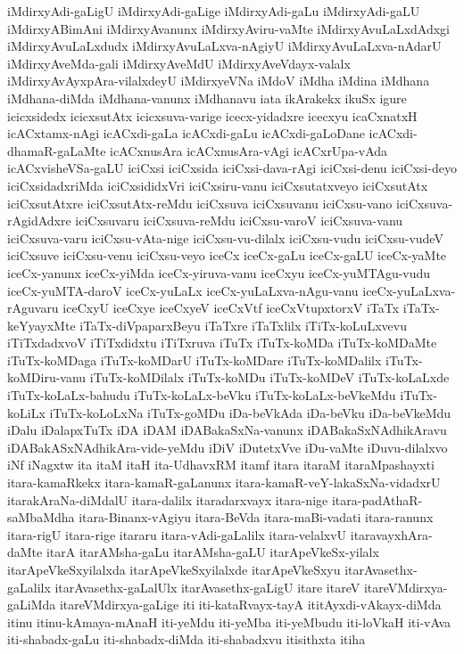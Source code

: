 {iMdirxyAdi-gaLigU
iMdirxyAdi-gaLige
iMdirxyAdi-gaLu
iMdirxyAdi-gaLU
iMdirxyABimAni
iMdirxyAvanunx
iMdirxyAviru-vaMte
iMdirxyAvuLaLxdAdxgi
iMdirxyAvuLaLxdudx
iMdirxyAvuLaLxva-nAgiyU
iMdirxyAvuLaLxva-nAdarU
iMdirxyAveMda-gali
iMdirxyAveMdU
iMdirxyAveVdayx-valalx
iMdirxyAvAyxpAra-vilalxdeyU
iMdirxyeVNa
iMdoV
iMdha
iMdina
iMdhana
iMdhana-diMda
iMdhana-vanunx
iMdhanavu
iata
ikArakekx
ikuSx
igure
icicxsidedx
icicxsutAtx
icicxsuva-varige
icecx-yidadxre
icecxyu
icaCxnatxH
icACxtamx-nAgi
icACxdi-gaLa
icACxdi-gaLu
icACxdi-gaLoDane
icACxdi-dhamaR-gaLaMte
icACxnusAra
icACxnusAra-vAgi
icACxrUpa-vAda
icACxvisheVSa-gaLU
iciCxsi
iciCxsida
iciCxsi-dava-rAgi
iciCxsi-denu
iciCxsi-deyo
iciCxsidadxriMda
iciCxsididxVri
iciCxsiru-vanu
iciCxsutatxveyo
iciCxsutAtx
iciCxsutAtxre
iciCxsutAtx-reMdu
iciCxsuva
iciCxsuvanu
iciCxsu-vano
iciCxsuva-rAgidAdxre
iciCxsuvaru
iciCxsuva-reMdu
iciCxsu-varoV
iciCxsuva-vanu
iciCxsuva-varu
iciCxsu-vAta-nige
iciCxsu-vu-dilalx
iciCxsu-vudu
iciCxsu-vudeV
iciCxsuve
iciCxsu-venu
iciCxsu-veyo
iceCx
iceCx-gaLu
iceCx-gaLU
iceCx-yaMte
iceCx-yanunx
iceCx-yiMda
iceCx-yiruva-vanu
iceCxyu
iceCx-yuMTAgu-vudu
iceCx-yuMTA-daroV
iceCx-yuLaLx
iceCx-yuLaLxva-nAgu-vanu
iceCx-yuLaLxva-rAguvaru
iceCxyU
iceCxye
iceCxyeV
iceCxVtf
iceCxVtupxtorxV
iTaTx
iTaTx-keYyayxMte
iTaTx-diVpaparxBeyu
iTaTxre
iTaTxlilx
iTiTx-koLuLxvevu
iTiTxdadxvoV
iTiTxdidxtu
iTiTxruva
iTuTx
iTuTx-koMDa
iTuTx-koMDaMte
iTuTx-koMDaga
iTuTx-koMDarU
iTuTx-koMDare
iTuTx-koMDalilx
iTuTx-koMDiru-vanu
iTuTx-koMDilalx
iTuTx-koMDu
iTuTx-koMDeV
iTuTx-koLaLxde
iTuTx-koLaLx-bahudu
iTuTx-koLaLx-beVku
iTuTx-koLaLx-beVkeMdu
iTuTx-koLiLx
iTuTx-koLoLxNa
iTuTx-goMDu
iDa-beVkAda
iDa-beVku
iDa-beVkeMdu
iDalu
iDalapxTuTx
iDA
iDAM
iDABakaSxNa-vanunx
iDABakaSxNAdhikAravu
iDABakASxNAdhikAra-vide-yeMdu
iDiV
iDutetxVve
iDu-vaMte
iDuvu-dilalxvo
iNf
iNagxtw
ita
itaM
itaH
ita-UdhavxRM
itamf
itara
itaraM
itaraMpashayxti
itara-kamaRkekx
itara-kamaR-gaLanunx
itara-kamaR-veY-lakaSxNa-vidadxrU
itarakAraNa-diMdalU
itara-dalilx
itaradarxvayx
itara-nige
itara-padAthaR-saMbaMdha
itara-Binanx-vAgiyu
itara-BeVda
itara-maBi-vadati
itara-ranunx
itara-rigU
itara-rige
itararu
itara-vAdi-gaLalilx
itara-velalxvU
itaravayxhAra-daMte
itarA
itarAMsha-gaLu
itarAMsha-gaLU
itarApeVkeSx-yilalx
itarApeVkeSxyilalxda
itarApeVkeSxyilalxde
itarApeVkeSxyu
itarAvasethx-gaLalilx
itarAvasethx-gaLalUlx
itarAvasethx-gaLigU
itare
itareV
itareVMdirxya-gaLiMda
itareVMdirxya-gaLige
iti
iti-kataRvayx-tayA
ititAyxdi-vAkayx-diMda
itinu
itinu-kAmaya-mAnaH
iti-yeMdu
iti-yeMba
iti-yeMbudu
iti-loVkaH
iti-vAva
iti-shabadx-gaLu
iti-shabadx-diMda
iti-shabadxvu
itisithxta
itiha
}
